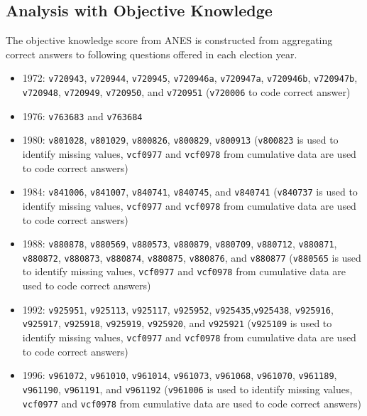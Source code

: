 \clearpage
\subsection{Analysis with Objective Knowledge}

\par The objective knowledge score from ANES is constructed from aggregating correct answers to following questions offered in each election year. 

\begin{itemize}
    \item 1972: \texttt{v720943}, \texttt{v720944}, \texttt{v720945}, \texttt{v720946a}, \texttt{v720947a}, \texttt{v720946b}, \texttt{v720947b}, \texttt{v720948}, \texttt{v720949}, \texttt{v720950}, and \texttt{v720951}  (\texttt{v720006} to code correct answer)
    \item 1976: \texttt{v763683} and \texttt{v763684}
    \item 1980: \texttt{v801028}, \texttt{v801029}, \texttt{v800826}, \texttt{v800829}, \texttt{v800913} (\texttt{v800823} is used to identify missing values, \texttt{vcf0977} and \texttt{vcf0978} from cumulative data are used to code correct answers)
    \item 1984: \texttt{v841006}, \texttt{v841007}, \texttt{v840741}, \texttt{v840745}, and \texttt{v840741} (\texttt{v840737} is used to identify missing values, \texttt{vcf0977} and \texttt{vcf0978} from cumulative data are used to code correct answers)
    \item 1988: \texttt{v880878}, \texttt{v880569}, \texttt{v880573}, \texttt{v880879}, \texttt{v880709}, \texttt{v880712}, \texttt{v880871}, \texttt{v880872}, \texttt{v880873}, \texttt{v880874}, \texttt{v880875}, \texttt{v880876}, and \texttt{v880877} (\texttt{v880565} is used to identify missing values, \texttt{vcf0977} and \texttt{vcf0978} from cumulative data are used to code correct answers)
    \item 1992: \texttt{v925951}, \texttt{v925113}, \texttt{v925117}, \texttt{v925952}, \texttt{v925435},\texttt{v925438}, \texttt{v925916}, \texttt{v925917}, \texttt{v925918}, \texttt{v925919}, \texttt{v925920}, and \texttt{v925921} (\texttt{v925109} is used to identify missing values, \texttt{vcf0977} and \texttt{vcf0978} from cumulative data are used to code correct answers)
    \item 1996: \texttt{v961072}, \texttt{v961010}, \texttt{v961014}, \texttt{v961073}, \texttt{v961068}, \texttt{v961070}, \texttt{v961189}, \texttt{v961190}, \texttt{v961191}, and \texttt{v961192} (\texttt{v961006} is used to identify missing values, \texttt{vcf0977} and \texttt{vcf0978} from cumulative data are used to code correct answers)

\end{itemize}
